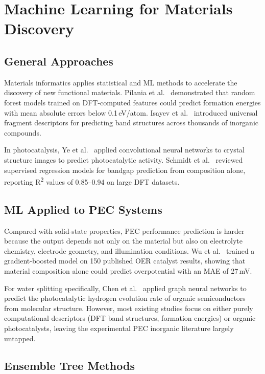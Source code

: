 \section{Machine Learning for Materials Discovery}

\subsection{General Approaches}

Materials informatics applies statistical and ML methods to accelerate
the discovery of new functional materials.
Pilania et al.~\cite{pilania2013accelerating} demonstrated that random
forest models trained on DFT-computed features could predict formation
energies with mean absolute errors below 0.1\,eV/atom.
Isayev et al.~\cite{isayev2017universal} introduced universal fragment
descriptors for predicting band structures across thousands of inorganic
compounds.

In photocatalysis, Ye et al.~\cite{ye2018deep} applied convolutional neural
networks to crystal structure images to predict photocatalytic activity.
Schmidt et al.~\cite{schmidt2019recent} reviewed supervised regression models
for bandgap prediction from composition alone, reporting R\textsuperscript{2}
values of 0.85--0.94 on large DFT datasets.

\subsection{ML Applied to PEC Systems}

Compared with solid-state properties, PEC performance prediction is harder
because the output depends not only on the material but also on electrolyte
chemistry, electrode geometry, and illumination conditions.
Wu et al.~\cite{wu2019machine} trained a gradient-boosted model on 150
published OER catalyst results, showing that material composition alone
could predict overpotential with an MAE of 27\,mV.

For water splitting specifically, Chen et al.~\cite{chen2019graph} applied
graph neural networks to predict the photocatalytic hydrogen evolution
rate of organic semiconductors from molecular structure.
However, most existing studies focus on either purely computational
descriptors (DFT band structures, formation energies) or organic
photocatalysts, leaving the experimental PEC inorganic literature
largely untapped.

\subsection{Ensemble Tree Methods}


